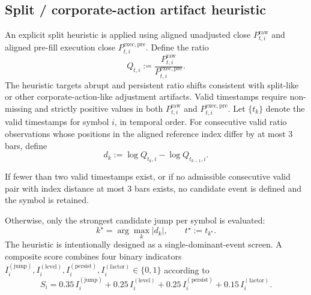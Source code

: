 \documentclass[11pt,a4paper]{article}
\begin{document}
\subsection{Split / corporate-action artifact heuristic}

An explicit split heuristic is applied using aligned unadjusted close
\(P^{\mathrm{raw}}_{t,i}\) and aligned pre-fill execution close
\(P^{\mathrm{exec,pre}}_{t,i}\). Define the ratio
\[
Q_{t,i}:=\frac{P^{\mathrm{raw}}_{t,i}}{P^{\mathrm{exec,pre}}_{t,i}}.
\]
The heuristic targets abrupt and persistent ratio shifts consistent with
split-like or other corporate-action-like adjustment artifacts. Valid
timestamps require non-missing and strictly positive values in both
\(P^{\mathrm{raw}}_{t,i}\) and \(P^{\mathrm{exec,pre}}_{t,i}\). Let \(\{t_k\}\)
denote the valid timestamps for symbol \(i\), in temporal order. For
consecutive valid ratio observations whose positions in the aligned reference
index differ by at most \(3\) bars, define
\[
d_k:=\log Q_{t_k,i}-\log Q_{t_{k-1},i}.
\]

If fewer than two valid timestamps exist, or if no admissible consecutive valid
pair with index distance at most \(3\) bars exists, no candidate event is
defined and the symbol is retained.

Otherwise, only the strongest candidate jump per symbol is evaluated:
\[
k^\star=\arg\max_k |d_k|,
\qquad
t^\star:=t_{k^\star}.
\]
The heuristic is intentionally designed as a single-dominant-event screen.
A composite score combines four binary indicators
\(
I_i^{(\mathrm{jump})}, I_i^{(\mathrm{level})},
I_i^{(\mathrm{persist})}, I_i^{(\mathrm{factor})}\in\{0,1\}
\)
according to
\[
S_i=
0.35\,I^{(\mathrm{jump})}_i+
0.25\,I^{(\mathrm{level})}_i+
0.25\,I^{(\mathrm{persist})}_i+
0.15\,I^{(\mathrm{factor})}_i.
\]
\end{document}
